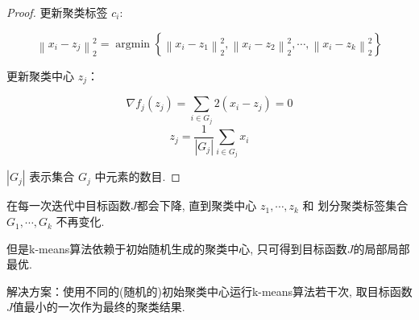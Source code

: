 \begin{proof}
    更新聚类标签 $ c_{i} $:

    $$ \left\|x_{i}-z_{j}\right\|_{2}^{2}=\operatorname{argmin}\left\{\left\|x_{i}-z_{1}\right\|_{2}^{2},\left\|x_{i}-z_{2}\right\|_{2}^{2}, \cdots,\left\|x_{i}-z_{k}\right\|_{2}^{2}\right\} $$

    更新聚类中心 $ z_{j} $：

    $$ \nabla f_{j}\left(z_{j}\right)=\sum_{i \in G_{j}} 2\left(x_{i}-z_{j}\right)=0 $$
$$ z_{j}=\frac{1}{\left|G_{j}\right|} \sum_{i \in G_{j}} x_{i} $$

$ \left|G_{j}\right| $ 表示集合 $ G_{j} $ 中元素的数目. 
\end{proof}

在每一次迭代中目标函数$J$都会下降, 直到聚类中心 $ z_{1}, \cdots, z_{k} $ 和 划分聚类标签集合 $ G_{1}, \cdots, G_{k} $ 不再变化. 

但是k-means算法依赖于初始随机生成的聚类中心, 只可得到目标函数$J$的局部局部最优. 

解决方案：使用不同的(随机的)初始聚类中心运行k-means算法若干次, 取目标函数$J$值最小的一次作为最终的聚类结果. 

